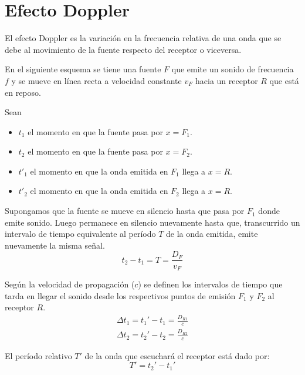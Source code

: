 \documentclass[a5paper,12pt,twoside]{book}
\begin{document}
\section{Efecto Doppler}

El efecto Doppler es la variación en la frecuencia relativa de una onda que se debe al movimiento de la fuente respecto del receptor o viceversa.

En el siguiente esquema se tiene una fuente $F$ que emite un sonido de frecuencia $f$ y se mueve en línea recta a velocidad constante $v_F$ hacia un receptor $R$ que está en reposo.

\begin{center}
    \def\svgwidth{0.8\linewidth}
    
\end{center}

Sean
\begin{itemize}
    \item $t_1$ el momento en que la fuente pasa por $x=F_1$.
    \item $t_2$ el momento en que la fuente pasa por $x=F_2$.
    \item $t'_1$ el momento en que la onda emitida en $F_1$ llega a $x=R$.
    \item $t'_2$ el momento en que la onda emitida en $F_2$ llega a $x=R$.
\end{itemize}

Supongamos que la fuente se mueve en silencio hasta que pasa por $F_1$ donde emite sonido. Luego permanece en silencio nuevamente hasta que, transcurrido un intervalo de tiempo equivalente al período $T$ de la onda emitida, emite nuevamente la misma señal.
\begin{equation*}
    t_2-t_1 = T = \frac{D_F}{v_F}
\end{equation*}

Según la velocidad de propagación ($c$) se definen los intervalos de tiempo que tarda en llegar el sonido desde los respectivos puntos de emisión $F_1$ y $F_2$ al receptor $R$.
\begin{gather*}
    \Delta t_1 = t_1' - t_1 = \frac{D_{R1}}{c}
    \\
    \Delta t_2 = t_2' - t_2 = \frac{D_{R2}}{c}
\end{gather*}

El período relativo $T'$ de la onda que escuchará el receptor está dado por:
\begin{equation*}
    T' = t_2'-t_1'
\end{equation*}
\end{document}

